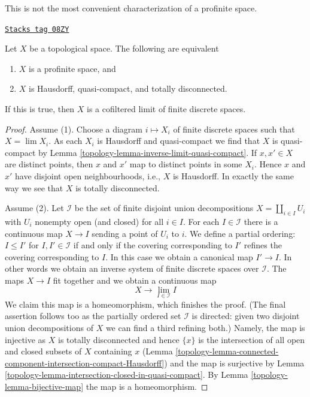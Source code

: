This is not the most convenient characterization of a profinite space.

\begin{lemma}[Profinite]
\label{topology-lemma-profinite}
\href{https://stacks.math.columbia.edu/tag/08ZY}{\texttt{Stacks tag 08ZY}}

Let $X$ be a topological space.
The following are equivalent
\begin{enumerate}
\item $X$ is a profinite space, and
\item $X$ is Hausdorff, quasi-compact, and totally disconnected.
\end{enumerate}
If this is true, then $X$ is a cofiltered limit of finite discrete
spaces.
\end{lemma}

\begin{proof}

Assume (1). Choose a diagram $i \mapsto X_i$ of finite discrete spaces
such that $X = \lim X_i$. As each $X_i$ is Hausdorff and quasi-compact we find
that $X$ is quasi-compact by Lemma \ref{topology-lemma-inverse-limit-quasi-compact}.
If $x, x' \in X$ are distinct points, then $x$ and $x'$ map to
distinct points in some $X_i$. Hence $x$ and $x'$ have disjoint
open neighbourhoods, i.e., $X$ is Hausdorff. In exactly the same way
we see that $X$ is totally disconnected.

\medskip\noindent
Assume (2). Let $\mathcal{I}$ be the set of finite disjoint union
decompositions $X = \coprod_{i \in I} U_i$ with $U_i$ nonempty open
(and closed) for all $i \in I$.
For each $I \in \mathcal{I}$ there is a continuous map
$X \to I$ sending a point of $U_i$ to $i$. We define a partial
ordering: $I \leq I'$ for $I, I' \in \mathcal{I}$ if and only
if the covering corresponding to $I'$ refines the covering corresponding
to $I$. In this case we obtain a canonical map $I' \to I$. In other
words we obtain an inverse system of finite discrete spaces over $\mathcal{I}$.
The maps $X \to I$ fit together and we obtain a continuous map
$$
X \longrightarrow \lim_{I \in \mathcal{I}} I
$$
We claim this map is a homeomorphism, which finishes the proof.
(The final assertion follows too as the partially ordered set
$\mathcal{I}$ is directed: given two disjoint union decompositions
of $X$ we can find a third refining both.)
Namely, the map is injective as $X$ is totally disconnected
and hence $\{x\}$ is the intersection of all open and closed subsets
of $X$ containing $x$
(Lemma \ref{topology-lemma-connected-component-intersection-compact-Hausdorff})
and  the map is surjective by
Lemma \ref{topology-lemma-intersection-closed-in-quasi-compact}.
By Lemma \ref{topology-lemma-bijective-map} the map is a homeomorphism.
\end{proof}

